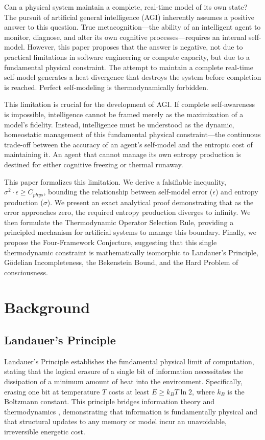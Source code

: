 \documentclass[12pt]{article}
\begin{document}
Can a physical system maintain a complete, real-time model of its own state? The pursuit of artificial general intelligence (AGI) inherently assumes a positive answer to this question. True metacognition---the ability of an intelligent agent to monitor, diagnose, and alter its own cognitive processes---requires an internal self-model. However, this paper proposes that the answer is negative, not due to practical limitations in software engineering or compute capacity, but due to a fundamental physical constraint. The attempt to maintain a complete real-time self-model generates a heat divergence that destroys the system before completion is reached. Perfect self-modeling is thermodynamically forbidden.

This limitation is crucial for the development of AGI. If complete self-awareness is impossible, intelligence cannot be framed merely as the maximization of a model's fidelity. Instead, intelligence must be understood as the dynamic, homeostatic management of this fundamental physical constraint---the continuous trade-off between the accuracy of an agent's self-model and the entropic cost of maintaining it. An agent that cannot manage its own entropy production is destined for either cognitive freezing or thermal runaway.

This paper formalizes this limitation. We derive a falsifiable inequality, $\sigma^2 \cdot \epsilon \ge C_{phys}$, bounding the relationship between self-model error ($\epsilon$) and entropy production ($\sigma$). We present an exact analytical proof demonstrating that as the error approaches zero, the required entropy production diverges to infinity. We then formulate the Thermodynamic Operator Selection Rule, providing a principled mechanism for artificial systems to manage this boundary. Finally, we propose the Four-Framework Conjecture, suggesting that this single thermodynamic constraint is mathematically isomorphic to Landauer's Principle, G\"{o}delian Incompleteness, the Bekenstein Bound, and the Hard Problem of consciousness.

\section{Background}

\subsection{Landauer's Principle}
Landauer's Principle \citep{landauer1961} establishes the fundamental physical limit of computation, stating that the logical erasure of a single bit of information necessitates the dissipation of a minimum amount of heat into the environment. Specifically, erasing one bit at temperature $T$ costs at least $E \ge k_B T \ln 2$, where $k_B$ is the Boltzmann constant. This principle bridges information theory and thermodynamics \citep{bennett1982}, demonstrating that information is fundamentally physical and that structural updates to any memory or model incur an unavoidable, irreversible energetic cost.
\end{document}
